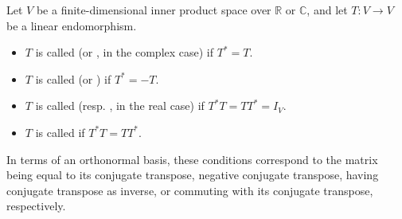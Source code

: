 \begin{definition} \label{definition:self_adjoint_hermitian_skew_symmetric_unitary_normal_operators}
    Let $V$ be a finite-dimensional inner product space over $\mathbb{R}$ or $\mathbb{C}$, and let $T: V \to V$ be a linear endomorphism.

    \begin{itemize}
        \item $T$ is called  (or , in the complex case) if $T^* = T$.
        \item $T$ is called  (or ) if $T^* = -T$.
        \item $T$ is called  (resp. , in the real case) if $T^* T = T T^* = I_V$.
        \item $T$ is called  if $T^* T = T T^*$.
    \end{itemize}

    In terms of an orthonormal basis, these conditions correspond to the matrix being equal to its conjugate transpose, negative conjugate transpose, having conjugate transpose as inverse, or commuting with its conjugate transpose, respectively.
\end{definition}
